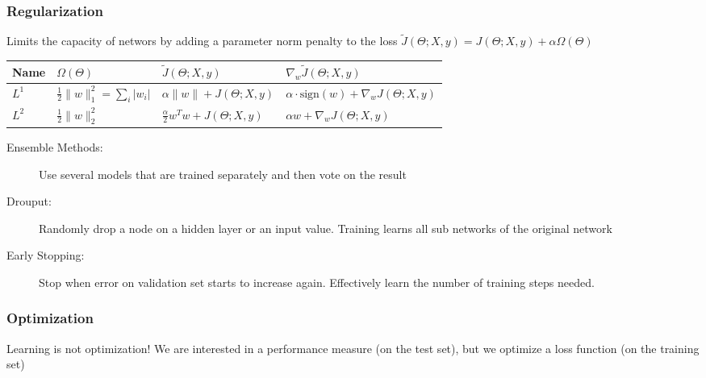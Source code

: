 \subsubsection{Regularization}
Limits the capacity of networs by adding a parameter norm penalty to the loss $\tilde{J}(\Theta; X, y) = J(\Theta; X, y) + \alpha \Omega(\Theta)$
\begin{tabular}{l l l l}
    \hline
    Name  & $\Omega(\Theta)$                                        & $\tilde{J}(\Theta; X, y)$                 & $\nabla_w\tilde{J}(\Theta; X, y)$                      \\\hline
    $L^1$ & $\frac{1}{2}\lVert w \rVert^2_1=\sum_i\lvert w_i\rvert$ & $\alpha \lVert w\rVert + J(\Theta; X, y)$ & $\alpha\cdot\text{sign}(w) + \nabla_w J(\Theta; X, y)$ \\
    $L^2$ & $\frac{1}{2}\lVert w \rVert^2_2$                        & $\frac{\alpha}{2}w^T w + J(\Theta; X, y)$ & $\alpha w + \nabla_w J(\Theta; X, y)$                  \\\hline
\end{tabular}
\begin{description}
    \item[Ensemble Methods:] Use several models that are trained separately and then vote on the result
    \item[Drouput:] Randomly drop a node on a hidden layer or an input value. Training learns all sub networks of the original network
    \item[Early Stopping:] Stop when error on validation set starts to increase again. Effectively learn the number of training steps needed.
\end{description}

\subsubsection{Optimization}
Learning is not optimization!
We are interested in a performance measure (on the test set), but we optimize a loss function (on the training set)

